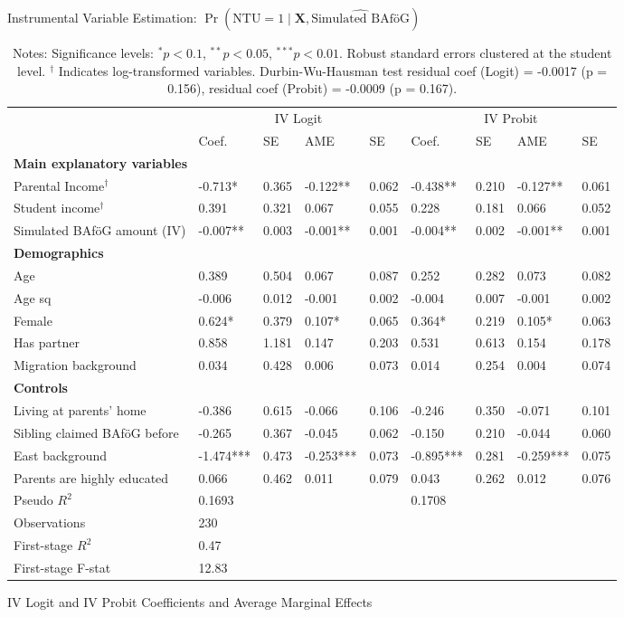 \begin{table}
\caption{Instrumental Variable Estimation: $\Pr(\mathrm{NTU} = 1 \mid \mathbf{X}, \widehat{\text{Simulated BAföG}})$}
\renewcommand{\arraystretch}{1.25}
\footnotesize
\centering
\begin{tabular}{lllllllll}
\toprule
 & \multicolumn{4}{c}{IV Logit} & \multicolumn{4}{c}{IV Probit} \\
\cmidrule(lr){2-5} \cmidrule(lr){6-9}
 & Coef. & SE & AME & SE & Coef. & SE & AME & SE \\
\midrule
\multicolumn{9}{l}{\textbf{Main explanatory variables}} \\
Parental Income$^\dagger$ & -0.713* & 0.365 & -0.122** & 0.062 & -0.438** & 0.210 & -0.127** & 0.061 \\
Student income$^\dagger$ & 0.391 & 0.321 & 0.067 & 0.055 & 0.228 & 0.181 & 0.066 & 0.052 \\
Simulated BAföG amount (IV) & -0.007** & 0.003 & -0.001** & 0.001 & -0.004** & 0.002 & -0.001** & 0.001 \\
\midrule
\multicolumn{9}{l}{\textbf{Demographics}} \\
Age & 0.389 & 0.504 & 0.067 & 0.087 & 0.252 & 0.282 & 0.073 & 0.082 \\
Age sq & -0.006 & 0.012 & -0.001 & 0.002 & -0.004 & 0.007 & -0.001 & 0.002 \\
Female & 0.624* & 0.379 & 0.107* & 0.065 & 0.364* & 0.219 & 0.105* & 0.063 \\
Has partner & 0.858 & 1.181 & 0.147 & 0.203 & 0.531 & 0.613 & 0.154 & 0.178 \\
Migration background & 0.034 & 0.428 & 0.006 & 0.073 & 0.014 & 0.254 & 0.004 & 0.074 \\
\midrule
\multicolumn{9}{l}{\textbf{Controls}} \\
Living at parents’ home & -0.386 & 0.615 & -0.066 & 0.106 & -0.246 & 0.350 & -0.071 & 0.101 \\
Sibling claimed BAföG before & -0.265 & 0.367 & -0.045 & 0.062 & -0.150 & 0.210 & -0.044 & 0.060 \\
East background & -1.474*** & 0.473 & -0.253*** & 0.073 & -0.895*** & 0.281 & -0.259*** & 0.075 \\
Parents are highly educated & 0.066 & 0.462 & 0.011 & 0.079 & 0.043 & 0.262 & 0.012 & 0.076 \\
\midrule
Pseudo $R^2$ & \multicolumn{4}{l}{0.1693} & \multicolumn{4}{l}{0.1708} \\
Observations & \multicolumn{8}{l}{230} \\
\midrule
First-stage $R^2$ & \multicolumn{8}{l}{0.47} \\
First-stage F-stat & \multicolumn{8}{l}{12.83} \\
\bottomrule
\end{tabular}
\caption*{IV Logit and IV Probit Coefficients and Average Marginal Effects}
\label{tab:logit_probit_results}
\caption*{\small{Notes: Significance levels: $^{*} p < 0.1$, $^{**} p < 0.05$, $^{***} p < 0.01$. Robust standard errors clustered at the student level. $^\dagger$ Indicates log-transformed variables. Durbin-Wu-Hausman test residual coef (Logit) = -0.0017 (p = 0.156), residual coef (Probit) = -0.0009 (p = 0.167).}}
\end{table}
